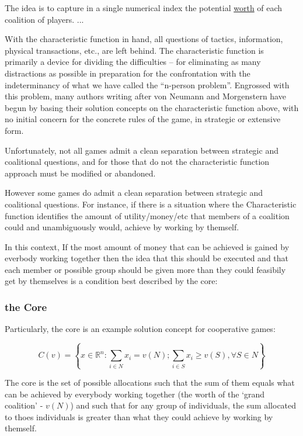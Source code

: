 \begin{displayquote}
The idea is to capture in a single numerical index the potential \underline{worth} of each coalition of players.
...

With the characteristic function in hand, all questions of tactics, information, physical transactions, etc., are left behind. The characteristic function is primarily a device for dividing the difficulties -- for eliminating as many distractions as possible in preparation for the confrontation with the indeterminancy of what we have called the ``n-person problem''. Engrossed with this problem, many authors writing after von Neumann and Morgenstern have begun by basing their solution concepts on the characteristic function above, with no initial concern for the concrete rules of the game, in strategic or extensive form.

Unfortunately, not all games admit a clean separation between strategic and coalitional questions, and for those that do not the characteristic function approach must be modified or abandoned.\cite{ShapleySchubikCharacteristicFunction}
\end{displayquote}

However some games do admit a clean separation between strategic and coalitional questions.
For instance, if there is a situation where the Characteristic function identifies the amount of utility/money/etc that members of a coalition could and unambiguously would, achieve by working by themself.

In this context, If the most amount of money that can be achieved is gained by everbody working together then the idea that this should be executed and that each member or possible group should be given more than they could feasibily get by themselves is a condition best described by the core:

\subsubsection{the Core}

Particularly, the core is an example solution concept for cooperative games:

$$ C(v) = \left\{x\in\mathbb{R}^n : \sum_{i\in N}x_i=v(N); \sum_{i\in S}x_i \ge v(S), \forall S\in N \right\}$$

The core is the set of possible allocations such that the sum of them equals what can be achieved by everybody working together (the worth of the `grand coalition' - $v(N)$) and such that for any group of individuals, the sum allocated to thoes individuals is greater than what they could achieve by working by themself.

